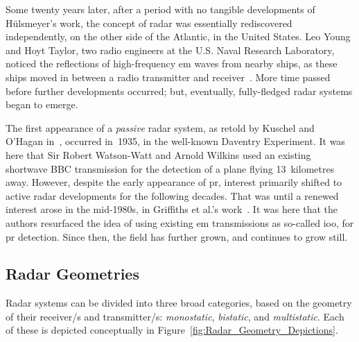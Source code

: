 \documentclass[class=report,11pt,crop=false]{standalone}
\begin{document}
Some twenty years later, after a period with no tangible developments of H\"ulsmeyer's work, the concept of radar was essentially rediscovered independently, on the other side of the Atlantic, in the United States. Leo Young and Hoyt Taylor, two radio engineers at the U.S. Naval Research Laboratory, noticed the reflections of high-frequency \gls{em} waves from nearby ships, as these ships moved in between a radio transmitter and receiver~\cite{brown1999technical}. More time passed before further developments occurred; but, eventually, fully-fledged radar systems began to emerge.

The first appearance of a \emph{passive} radar system, as retold by Kuschel and O'Hagan in~\cite{kuschel-hagan-history}, occurred in~1935, in the well-known Daventry Experiment. It was here that Sir Robert Watson-Watt and Arnold Wilkins used an existing shortwave BBC transmission for the detection of a plane flying 13~kilometres away. However, despite the early appearance of \gls{pr}, interest primarily shifted to active radar developments for the following decades. That was until a renewed interest arose in the mid-1980s, in Griffiths et al.'s work~\cite{Griffiths1986}. It was here that the authors resurfaced the idea of using existing \gls{em} transmissions as so-called \gls{ioo}, for \gls{pr} detection. Since then, the field has further grown, and continues to grow still.

\subsection{Radar Geometries}
Radar systems can be divided into three broad categories, based on the geometry of their receiver/s and transmitter/s: \emph{monostatic}, \emph{bistatic}, and \emph{multistatic}. Each of these is depicted conceptually in Figure~\ref{fig:Radar_Geometry_Depictions}.
\end{document}

